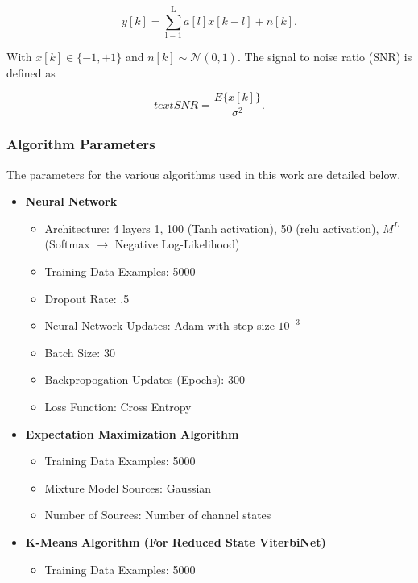 \documentclass[12pt,a4paper]{article}
\begin{document}
%


\begin{equation}
y[k] = \sum_{\mathrm{l=1}}^{\mathrm{L}} a[l]x[k-l] + n[k].
\end{equation}

With $x[k] \in \{ -1, +1\}$ and $n[k]  \sim \mathcal{N}(0,1)$.  
The signal to noise ratio (SNR) is defined as 

\begin{equation}
text{SNR} = \frac{E\{x[k]\}}{\sigma^2}.
\end{equation}


\subsubsection{Algorithm Parameters}
The parameters for the various algorithms used in this work are detailed below.
\begin{itemize}
\item \textbf{Neural Network}
\begin{itemize}
\item Architecture: 4 layers {1, 100 (Tanh activation), 50 (relu activation), $M^L$ (Softmax $\rightarrow$ Negative Log-Likelihood)}
\item Training Data Examples: 5000
\item Dropout Rate: .5
\item Neural Network Updates: Adam with step size $10^{-3}$ \cite{kingma2014adam}
\item Batch Size: 30 
\item Backpropogation Updates (Epochs): 300
\item Loss Function: Cross Entropy
\end{itemize}
\item \textbf{Expectation Maximization Algorithm}
\begin{itemize}
\item Training Data Examples: 5000
\item Mixture Model Sources: Gaussian
\item Number of Sources: Number of channel states
\end{itemize}
\item \textbf{K-Means Algorithm (For Reduced State ViterbiNet)}
\begin{itemize}
\item Training Data Examples: 5000
\end{itemize}
\end{itemize}
\end{document}
